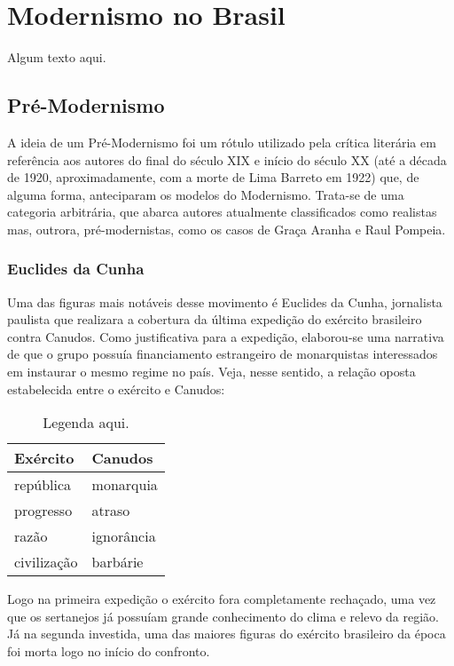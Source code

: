 
\chapter{Modernismo no Brasil}

Algum texto aqui.

\section{Pré-Modernismo}

A ideia de um Pré-Modernismo foi um rótulo utilizado pela crítica literária em referência aos autores do final do século XIX e início do século XX (até a década de 1920, aproximadamente, com a morte de Lima Barreto em 1922) que, de alguma forma, anteciparam os modelos do Modernismo. Trata-se de uma categoria arbitrária, que abarca autores atualmente classificados como realistas mas, outrora, pré-modernistas, como os casos de Graça Aranha e Raul Pompeia.

\subsection{Euclides da Cunha}

Uma das figuras mais notáveis desse movimento é Euclides da Cunha, jornalista paulista que realizara a cobertura da última expedição do exército brasileiro contra Canudos. Como justificativa para a expedição, elaborou-se uma narrativa de que o grupo possuía financiamento estrangeiro de monarquistas interessados em instaurar o mesmo regime no país. Veja, nesse sentido, a relação oposta estabelecida entre o exército e Canudos:

\begin{table}[h]
\centering
\begin{tabular}{l l}
\toprule
\textbf{Exército} & \textbf{Canudos} \\
\midrule
república & monarquia \\
progresso & atraso \\
razão & ignorância \\
civilização & barbárie \\
\bottomrule
\end{tabular}
\caption{Legenda aqui.}
\end{table}

Logo na primeira expedição o exército fora completamente rechaçado, uma vez que os sertanejos já possuíam grande conhecimento do clima e relevo da região. Já na segunda investida, uma das maiores figuras do exército brasileiro da época foi morta logo no início do confronto.

